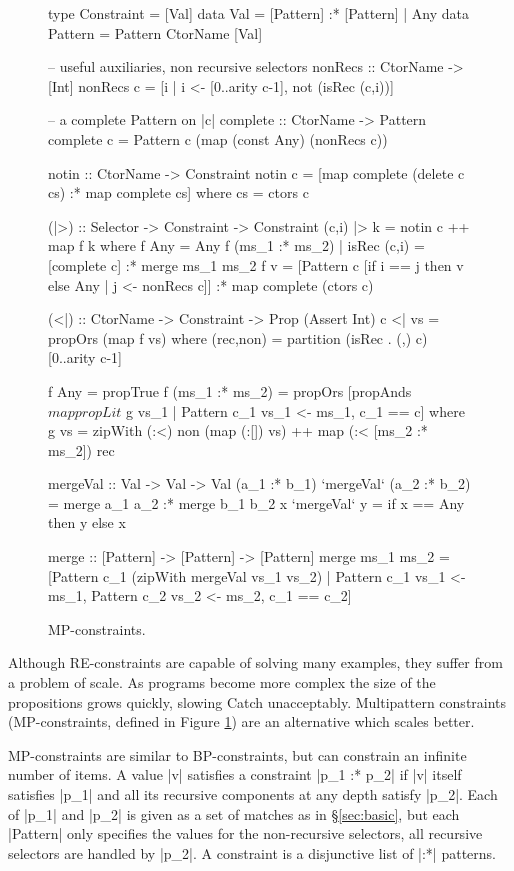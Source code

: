 \documentclass[preprint]{sigplanconf}
\begin{document}
\begin{figure}
\begin{code}
type Constraint  =  [Val]
data Val         =  [Pattern] :* [Pattern] |  Any
data Pattern     =  Pattern CtorName [Val]

-- useful auxiliaries, non recursive selectors
nonRecs :: CtorName -> [Int]
nonRecs c = [i | i <- [0..arity c-1], not (isRec (c,i))]

-- a complete Pattern on |c|
complete :: CtorName -> Pattern
complete c = Pattern c (map (const Any) (nonRecs c))

notin :: CtorName -> Constraint
notin c = [map complete (delete c cs) :* map complete cs]
    where cs = ctors c

(|>) :: Selector -> Constraint -> Constraint
(c,i) |> k = notin c ++ map f k
    where
    f Any = Any
    f (ms_1 :* ms_2) | isRec (c,i) = [complete c] :* merge ms_1 ms_2
    f v =  [Pattern c [if i == j then v else Any | j <- nonRecs c]]
           :* map complete (ctors c)

(<|) :: CtorName -> Constraint -> Prop (Assert Int)
c <| vs = propOrs (map f vs)
    where
    (rec,non) = partition (isRec . (,) c) [0..arity c-1]

    f Any = propTrue
    f (ms_1 :* ms_2) =  propOrs  [propAnds $ map propLit $ g vs_1
                               | Pattern c_1 vs_1 <- ms_1, c_1 == c]
        where g vs =  zipWith (:<) non (map (:[]) vs) ++
                      map (:< [ms_2 :* ms_2]) rec

mergeVal :: Val -> Val -> Val
(a_1 :* b_1)  `mergeVal`  (a_2 :* b_2)  = merge a_1 a_2 :* merge b_1 b_2
x           `mergeVal`  y           = if x == Any then y else x

merge :: [Pattern] -> [Pattern] -> [Pattern]
merge  ms_1 ms_2 = [Pattern c_1 (zipWith mergeVal vs_1 vs_2) |
       Pattern c_1 vs_1 <- ms_1, Pattern c_2 vs_2 <- ms_2, c_1 == c_2]
\end{code}
\caption{MP-constraints.}
\label{fig:enumeration}
\end{figure}

Although RE-constraints are capable of solving many examples, they suffer from a problem of scale. As programs become more complex the size of the propositions grows quickly, slowing Catch unacceptably. Multipattern constraints (MP-constraints, defined in Figure \ref{fig:enumeration}) are an alternative which scales better.

MP-constraints are similar to BP-constraints, but can constrain an infinite number of items. A value |v| satisfies a constraint |p_1 :* p_2| if |v| itself satisfies |p_1| and all its recursive components at any depth satisfy |p_2|. Each of |p_1| and |p_2| is given as a set of matches as in \S\ref{sec:basic}, but each |Pattern| only specifies the values for the non-recursive selectors, all recursive selectors are handled by |p_2|. A constraint is a disjunctive list of |:*| patterns.
\end{document}
